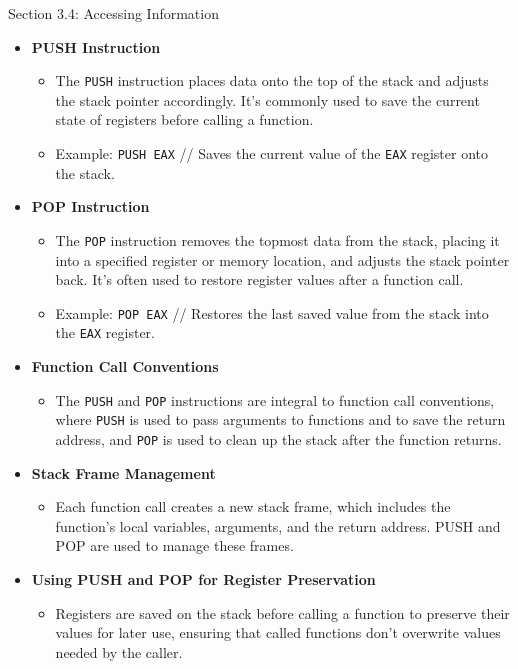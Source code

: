 \begin{notes}{Section 3.4: Accessing Information}
    \begin{itemize}
        \item \textbf{PUSH Instruction}
        \begin{itemize}
            \item The \texttt{PUSH} instruction places data onto the top of the stack and adjusts the stack pointer accordingly. It's commonly used to save the current state of registers before calling 
            a function.
            \item Example: \texttt{PUSH EAX} // Saves the current value of the \texttt{EAX} register onto the stack.
        \end{itemize}
        \item \textbf{POP Instruction}
        \begin{itemize}
            \item The \texttt{POP} instruction removes the topmost data from the stack, placing it into a specified register or memory location, and adjusts the stack pointer back. It's often used to 
            restore register values after a function call.
            \item Example: \texttt{POP EAX} // Restores the last saved value from the stack into the \texttt{EAX} register.
        \end{itemize}
        \item \textbf{Function Call Conventions}
        \begin{itemize}
            \item The \texttt{PUSH} and \texttt{POP} instructions are integral to function call conventions, where \texttt{PUSH} is used to pass arguments to functions and to save the return address, 
            and \texttt{POP} is used to clean up the stack after the function returns.
        \end{itemize}
        \item \textbf{Stack Frame Management}
        \begin{itemize}
            \item Each function call creates a new stack frame, which includes the function's local variables, arguments, and the return address. PUSH and POP are used to manage these frames.
        \end{itemize}
        \item \textbf{Using PUSH and POP for Register Preservation}
        \begin{itemize}
            \item Registers are saved on the stack before calling a function to preserve their values for later use, ensuring that called functions don't overwrite values needed by the caller.
        \end{itemize}
    \end{itemize}


\end{notes}

